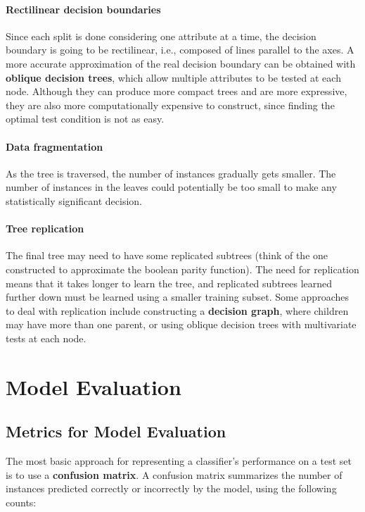 \paragraph{Rectilinear decision boundaries}
Since each split is done considering one attribute at a time, the decision boundary is going to be rectilinear, i.e., composed of lines parallel to the axes. A more accurate approximation of the real decision boundary can be obtained with \textbf{oblique decision trees}, which allow multiple attributes to be tested at each node. Although they can produce more compact trees and are more expressive, they are also more computationally expensive to construct, since finding the optimal test condition is not as easy.

\paragraph{Data fragmentation}
As the tree is traversed, the number of instances gradually gets smaller. The number of instances in the leaves could potentially be too small to make any statistically significant decision.

\paragraph{Tree replication}
The final tree may need to have some replicated subtrees (think of the one constructed to approximate the boolean parity function). The need for replication means that it takes longer to learn the tree, and replicated subtrees learned further down must be learned using a smaller training subset. Some approaches to deal with replication include constructing a \textbf{decision graph}, where children may have more than one parent, or using oblique decision trees with multivariate tests at each node.

\section{Model Evaluation}
\subsection{Metrics for Model Evaluation}

The most basic approach for representing a classifier's performance on a test set is to use a \textbf{confusion matrix}. A confusion matrix summarizes the number of instances predicted correctly or incorrectly by the model, using the following counts:

